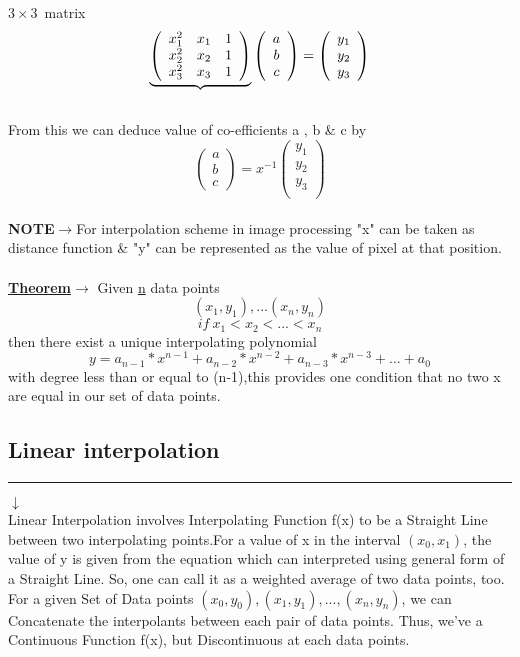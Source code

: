 \documentclass[a4paper, 12pt]{article}
\begin{document}
$3 \times 3$~matrix 
\[  \underbrace{\left( \begin{array}{ccc}
x_1^2 & x_1 & 1 \\
x_2^2 & x_2 & 1 \\
 x_3^2 & x_3 & 1 \end{array} \\ \right)} 
\left( \begin{array}{ccc}
a\\
b\\
c\end{array} \right)=\left(\begin{array}{ccc}
y_1\\
y_2\\
y_3\\
\end{array} \right)\]\\
From this we can deduce value of co-efficients a , b \& c by\\
\[ \left(\begin{array}{ccc}
a\\
b\\
c\end{array} \right)= x^{-1} \left(\begin{array}{ccc}
y_1\\
y_2\\
y_3\\
\end{array} \right)\] \\
\textbf{NOTE}$\rightarrow$For interpolation scheme in image processing "x" can be taken as distance function \& "y"
can be represented as the value of pixel at that position.\\ \\
\underline{\textbf{Theorem}}$\rightarrow$ Given \underline{n} data points \[(x_1,y_1),...(x_n,y_n)\]  \[if\ x_1<x_2<...<x_n\] then there exist a unique interpolating polynomial \[y=a_
{n-1}*x^{n-1}+a_{n-2}*x^{n-2}+a_{n-3}*x^{n-3}+...+a_0  \] with degree less than or equal to (n-1),this provides one condition that no two x are equal in our set of data points.
\subsection{Linear interpolation}\hrule
$\downarrow$\\
Linear Interpolation involves Interpolating Function f(x) to be a Straight Line between two interpolating points.For a value of x in the interval $(x_0,x_1)$, the value of y is given from the equation              which can interpreted using general form of a Straight Line.
So, one can call it as a weighted average of two data points, too.
 For a given Set of Data points $(x_0,y_0),(x_1,y_1),...,(x_n,y_n)$, we can Concatenate the interpolants between each pair of data points. Thus, we've a Continuous Function f(x), but Discontinuous at each data points.
\end{document}
